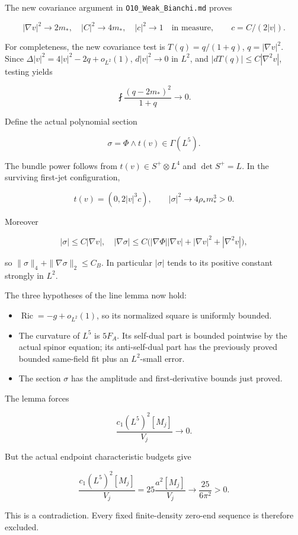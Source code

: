\documentclass[11pt]{article}
\providecommand{\tightlist}{\setlength{\itemsep}{0pt}\setlength{\parskip}{0pt}}
\begin{document}
The new covariance argument in \texttt{O10\_\allowbreak{}Weak\_\allowbreak{}Bianchi.md} proves

\[
 |\nabla v|^2\to2m_*,\quad |C|^2\to4m_*,\quad
 |c|^2\to1\quad\text{in measure},
 \qquad c=C/(2|v|).
\tag{15}
\]

For completeness, the new covariance test is \(T(q)=q/(1+q)\),
\(q=|\nabla v|^2\). Since \(\Delta|v|^2=4|v|^2-2q+o_{L^2}(1)\),
\(d|v|^2\to0\) in \(L^2\), and \(|dT(q)|\le C|\nabla^2v|\), testing
yields

\[
 \fint\frac{(q-2m_*)^2}{1+q}\longrightarrow0.
\]

Define the actual polynomial section

\[
 \sigma=\Phi\wedge t(v)\in\Gamma(L^5).
\]

The bundle power follows from \(t(v)\in S^+\otimes L^4\) and
\(\det S^+=L\). In the surviving first-jet configuration,

\[
 t(v)=(0,2|v|^3c),\qquad
 |\sigma|^2\to4\rho_*m_*^3>0.
\]

Moreover

\[
 |\sigma|\le C|\nabla v|,
\quad
 |\nabla\sigma|\le C\bigl(
 |\nabla\Phi||\nabla v|+|\nabla v|^2+|\nabla^2v|\bigr),
\]

so \(\|\sigma\|_4+\|\nabla\sigma\|_2\le C_B\). In particular
\(|\sigma|\) tends to its positive constant strongly in \(L^2\).

The three hypotheses of the line lemma now hold:

\begin{itemize}
\tightlist
\item
  \(\operatorname{Ric}=-g+o_{L^2}(1)\), so its normalized square is
  uniformly bounded.
\item
  The curvature of \(L^5\) is \(5F_A\). Its self-dual part is bounded
  pointwise by the actual spinor equation; its anti-self-dual part has
  the previously proved bounded same-field fit plus an \(L^2\)-small
  error.
\item
  The section \(\sigma\) has the amplitude and first-derivative bounds
  just proved.
\end{itemize}

The lemma forces

\[
 \frac{c_1(L^5)^2[M_j]}{V_j}\to0.
\]

But the actual endpoint characteristic budgets give

\[
 \frac{c_1(L^5)^2[M_j]}{V_j}
 =25\frac{a^2[M_j]}{V_j}
 \longrightarrow\frac{25}{6\pi^2}>0.
\tag{16}
\]

This is a contradiction. Every fixed finite-density zero-end sequence is
therefore excluded.
\end{document}

